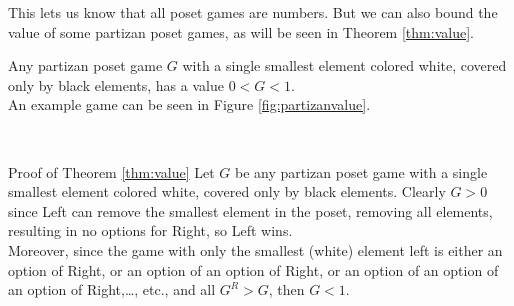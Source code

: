 This lets us know that all poset games are numbers. But we can also bound the value of some partizan poset games, as will be seen in Theorem \ref{thm:value}.

\begin{minipage}[b]{0.5\textwidth}
\begin{thm}
Any partizan poset game $G$ with a single smallest element colored white, covered only by black elements, has a value $0< G< 1$. 
\\
An example game can be seen in Figure \ref{fig:partizanvalue}.
\label{thm:value}
\end{thm}
\end{minipage}
\begin{minipage}{0.05\textwidth}
~
\end{minipage}
\begin{minipage}[b]{0.45\textwidth}

\centering
{}
\label{fig:partizanvalue}
\end{minipage}
\begin{proof2}{Proof of Theorem \ref{thm:value}}
Let $G$ be any partizan poset game with a single smallest element colored white, covered only by black elements. Clearly $G>0$ since Left can remove the smallest element in the poset, removing all elements, resulting in no options for Right, so Left wins. 
\\
Moreover, since the game with only the smallest (white) element left is either an option of Right, or an option of an option of Right, or an option of an option of an option of Right,\dots, etc., and all $G^R>G$, then $G<1$.
\end{proof2}
